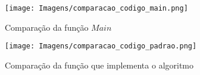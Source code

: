 \begin{figure}[H]
\centering
\texttt{[image: Imagens/comparacao\_codigo\_main.png]}
\caption{Comparação da função $Main$}
\label{fig:comparacao_codigo_main}
\end{figure}

\begin{figure}[H]
\centering
\texttt{[image: Imagens/comparacao\_codigo\_padrao.png]}
\caption{Comparação da função que implementa o algoritmo}
\label{fig:comparacao_codigo_padrao}
\end{figure}
